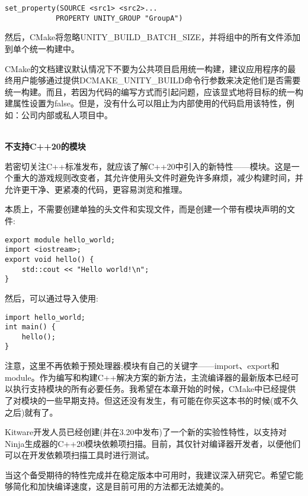 \begin{lstlisting}[style=styleCMake]
set_property(SOURCE <src1> <src2>...
			PROPERTY UNITY_GROUP "GroupA")
\end{lstlisting}

然后，CMake将忽略UNITY\_BUILD\_BATCH\_SIZE，并将组中的所有文件添加到单个统一构建中。

CMake的文档建议默认情况下不要为公共项目启用统一构建，建议应用程序的最终用户能够通过提供DCMAKE\_UNITY\_BUILD命令行参数来决定他们是否需要统一构建。而且，若因为代码的编写方式而引起问题，应该显式地将目标的统一构建属性设置为false。但是，没有什么可以阻止为内部使用的代码启用该特性，例如：公司内部或私人项目中。

\hspace*{\fill} \\ %
\noindent
\textbf{不支持C++20的模块}

若密切关注C++标准发布，就应该了解C++20中引入的新特性——模块。这是一个重大的游戏规则改变者，其允许使用头文件时避免许多麻烦，减少构建时间，并允许更干净、更紧凑的代码，更容易浏览和推理。

本质上，不需要创建单独的头文件和实现文件，而是创建一个带有模块声明的文件:

\begin{lstlisting}[style=styleCXX]
export module hello_world;
import <iostream>;
export void hello() {
	std::cout << "Hello world!\n";
}
\end{lstlisting}

然后，可以通过导入使用:

\begin{lstlisting}[style=styleCXX]
import hello_world;
int main() {
	hello();
}
\end{lstlisting}

注意，这里不再依赖于预处理器;模块有自己的关键字——import、export和module。作为编写和构建C++解决方案的新方法，主流编译器的最新版本已经可以执行支持模块的所有必要任务。我希望在本章开始的时候，CMake中已经提供了对模块的一些早期支持。但这还没有发生，有可能在你买这本书的时候(或不久之后)就有了。

Kitware开发人员已经创建(并在3.20中发布)了一个新的实验性特性，以支持对Ninja生成器的C++20模块依赖项扫描。目前，其仅针对编译器开发者，以便他们可以在开发依赖项扫描工具时进行测试。

当这个备受期待的特性完成并在稳定版本中可用时，我建议深入研究它。希望它能够简化和加快编译速度，这是目前可用的方法都无法媲美的。


